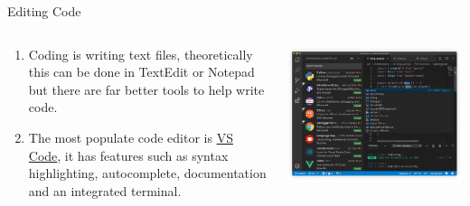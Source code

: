 \documentclass[aspectratio=169]{beamer}
\begin{document}
\begin{frame}{Editing Code}
\begin{columns}

\begin{column}{0.4\textwidth}
\begin{enumerate}
  \item Coding is writing text files, theoretically this can be done in TextEdit or Notepad but there are far better tools to help write code. 
	
	\item The most populate code editor is \href{https://code.visualstudio.com}{VS Code}, it has features such as syntax highlighting, autocomplete, documentation and an integrated terminal. 
\end{enumerate}

\end{column}

\begin{column}{0.6\textwidth}
\includegraphics[width=0.9\linewidth]{graphics/home-screenshot-mac.png}	
\end{column}


\end{columns}

	
	
		
\end{frame}
\end{document}
